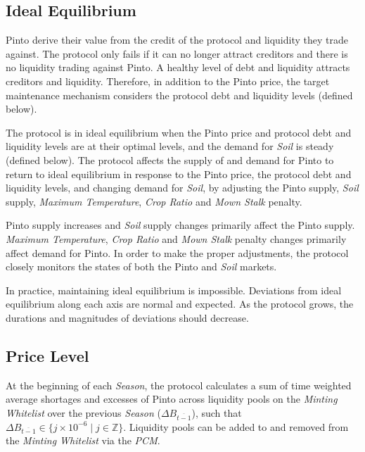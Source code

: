 \documentclass[tikz]{article}
\newcommand{\term}[1]{\textsl{#1}}
\begin{document}

\subsection{Ideal Equilibrium}

Pinto derive their value from the credit of the protocol and liquidity they trade against. The protocol only fails if it can no longer attract creditors and there is no liquidity trading against Pinto. A healthy level of debt and liquidity attracts creditors and liquidity. Therefore, in addition to the Pinto price, the target maintenance mechanism considers the protocol debt and liquidity levels (defined below). 

The protocol is in ideal equilibrium when the Pinto price and protocol debt and liquidity levels are at their optimal levels, and the demand for \term{Soil} is steady (defined below). The protocol affects the supply of and demand for Pinto to return to ideal equilibrium in response to the Pinto price, the protocol debt and liquidity levels, and changing demand for \term{Soil}, by adjusting the Pinto supply, \term{Soil} supply, \term{Maximum Temperature}, \term{Crop Ratio} and \term{Mown Stalk} penalty. 

Pinto supply increases and \term{Soil} supply changes primarily affect the Pinto supply. \term{Maximum Temperature}, \term{Crop Ratio} and \term{Mown Stalk} penalty changes primarily affect demand for Pinto. In order to make the proper adjustments, the protocol closely monitors the states of both the Pinto and \term{Soil} markets.

In practice, maintaining ideal equilibrium is impossible. Deviations from ideal equilibrium along each axis are normal and expected. As the protocol grows, the durations and magnitudes of deviations should decrease. 


\vspace*{2mm}

\subsection{Price Level}
\vspace*{2mm}

At the beginning of each \term{Season}, the protocol calculates a sum of time weighted average shortages and excesses of Pinto across liquidity pools on the \term{Minting Whitelist} over the previous \term{Season} ($\Delta B_{\overline{t-1}}$), such that $\Delta B_{\overline{t-1}} \in \{j \times 10^{-6} \mid j \in \mathbb{Z} \}$. Liquidity pools can be added to and removed from the \term{Minting Whitelist} via the \term{PCM}.
\end{document}
